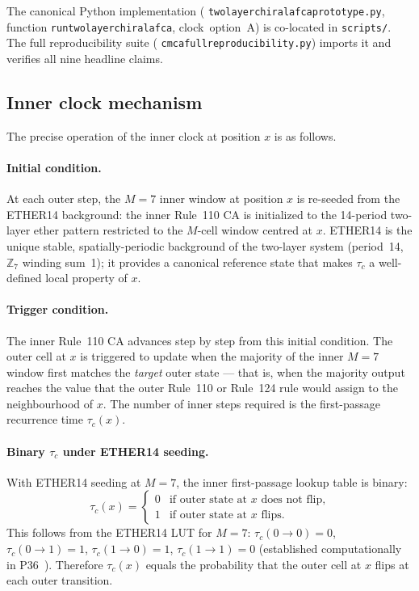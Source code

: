 \documentclass[11pt]{article}
\theoremstyle{remark}
\newcommand{\ZS}{\mathbb{Z}_7}
\newcommand{\lean}[1]{%
  \penalty-100
  \begingroup\def\_{\textunderscore\allowbreak}\texttt{#1}\endgroup}
\begin{document}
\noindent The canonical Python implementation
(\lean{two\_layer\_chiral\_afca\_prototype.py},
function \lean{run\_two\_layer\_chiral\_afca},
clock~option~A) is co-located in \texttt{scripts/}.
The full reproducibility suite
(\lean{cmca\_full\_reproducibility.py}) imports it
and verifies all nine headline claims.

\subsection{Inner clock mechanism}
\label{ssec:inner_clock_mechanism}

The precise operation of the inner clock at position $x$ is as follows.

\paragraph{Initial condition.}
At each outer step, the $M=7$ inner window at position $x$ is re-seeded from
the ETHER14 background: the inner Rule~110 CA is initialized to the 14-period
two-layer ether pattern restricted to the $M$-cell window centred at $x$.
ETHER14 is the unique stable, spatially-periodic background of the two-layer
system (period~14, $\ZS$ winding sum~1); it provides a canonical reference
state that makes $\tau_c$ a well-defined local property of $x$.

\paragraph{Trigger condition.}
The inner Rule~110 CA advances step by step from this initial condition.
The outer cell at $x$ is triggered to update when the majority of the inner
$M=7$ window first matches the \emph{target} outer state — that is, when the
majority output reaches the value that the outer Rule~110 or Rule~124 rule
would assign to the neighbourhood of $x$.  The number of inner steps required
is the first-passage recurrence time $\tau_c(x)$.

\paragraph{Binary $\tau_c$ under ETHER14 seeding.}
With ETHER14 seeding at $M=7$, the inner first-passage lookup table is binary:
\begin{equation}
  \label{eq:tauc_binary}
  \tau_c(x) = \begin{cases} 0 & \text{if outer state at } x \text{ does not flip,} \\ 1 & \text{if outer state at } x \text{ flips.} \end{cases}
\end{equation}
This follows from the ETHER14 LUT for $M=7$: $\tau_c(0\to0)=0$,
$\tau_c(0\to1)=1$, $\tau_c(1\to0)=1$, $\tau_c(1\to1)=0$
(established computationally in P36~\cite{SpivackEmergentGravity}).
Therefore $\tau_c(x)$ equals the probability that the outer cell at $x$ flips
at each outer transition.
\end{document}
